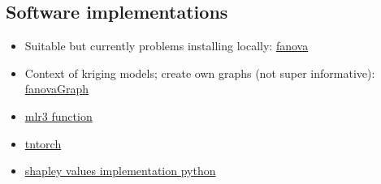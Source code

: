 



\subsection{Software implementations}
\begin{itemize}
    \item Suitable but currently problems installing locally: \href{https://github.com/frank-hutter/fanova?tab=readme-ov-file}{fanova}
    \item Context of kriging models; create own graphs (not super informative): \href{https://cran.r-project.org/web/packages/fanovaGraph/fanovaGraph.pdf?utm_source=chatgpt.com}{fanovaGraph}
    \item \href{https://rdrr.io/github/guillermozbta/mir/man/generateFunctionalANOVAData.html}{mlr3 function}
    \item \href{https://tntorch.readthedocs.io/en/latest/tutorials/anova.html}{tntorch}
    \item \href{https://pypi.org/project/shapiq/}{shapley values implementation python}
\end{itemize}

